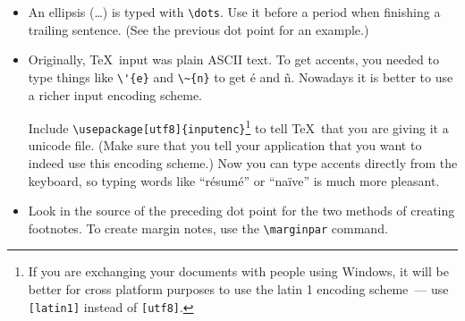 \documentclass[article]{memoir}
\begin{document}
\begin{itemize}
\item	An ellipsis (\dots) is typed with \verb|\dots|. Use it before a period when finishing a trailing sentence. (See the previous dot point for an example.) 
	
\item	Originally, \TeX\ input was plain ASCII text. To get accents, you needed to type things like \verb|\'{e}| and \verb|\~{n}| to get \'e and \~n. Nowadays it is better to use a richer input encoding scheme.

Include \verb|\usepackage[utf8]{inputenc}|\footnote{If you are exchanging your documents with people using Windows, it will be better for cross platform purposes to use the latin 1 encoding scheme~--- use \texttt{[latin1]} instead of \texttt{[utf8]}.} to tell \TeX\ that you are giving it a unicode file. (Make sure that you tell your application that you want to indeed use this encoding scheme.\footnotemark) Now you can type accents directly from the keyboard, so typing words like ``résumé'' or ``naïve'' is much more pleasant.


\item	Look in the source of the preceding dot point for the two methods of creating footnotes.  To create margin notes, use the \verb|\marginpar| command.

\end{itemize}
\end{document}
